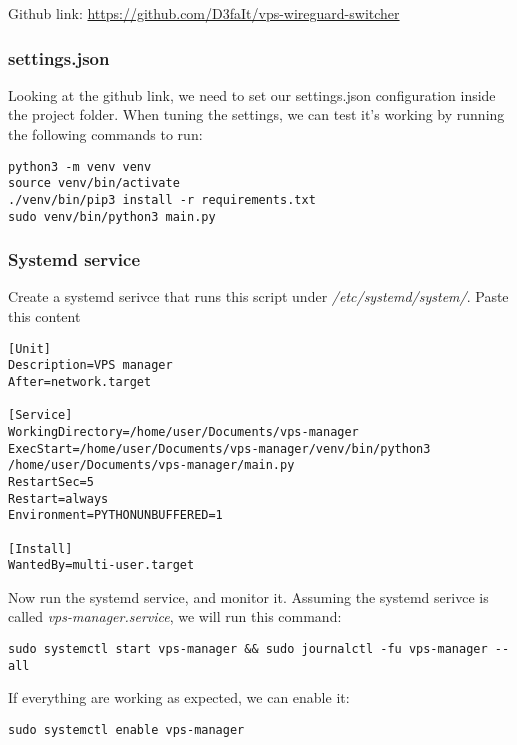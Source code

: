 \documentclass[letterpaper, 11pt]{article}
\begin{document}
Github link: \url{https://github.com/D3faIt/vps-wireguard-switcher}

\subsubsection{settings.json}
\label{sec:orgb27e8f2}
Looking at the github link, we need to set our settings.json configuration inside the project folder.
When tuning the settings, we can test it's working by running the following commands to run:

\begin{verbatim}
python3 -m venv venv
source venv/bin/activate
./venv/bin/pip3 install -r requirements.txt
sudo venv/bin/python3 main.py
\end{verbatim}

\subsubsection{Systemd service}
\label{sec:org1f88bd2}

Create a systemd serivce that runs this script under \textit{/etc/systemd/system/}.
Paste this content
\begin{verbatim}
[Unit]
Description=VPS manager
After=network.target

[Service]
WorkingDirectory=/home/user/Documents/vps-manager
ExecStart=/home/user/Documents/vps-manager/venv/bin/python3 /home/user/Documents/vps-manager/main.py
RestartSec=5
Restart=always
Environment=PYTHONUNBUFFERED=1

[Install]
WantedBy=multi-user.target
\end{verbatim}

Now run the systemd service, and monitor it. Assuming the systemd serivce is called \textit{vps-manager.service}, we will run this command:

\begin{verbatim}
sudo systemctl start vps-manager && sudo journalctl -fu vps-manager --all
\end{verbatim}

If everything are working as expected, we can enable it:
\begin{verbatim}
sudo systemctl enable vps-manager
\end{verbatim}
\end{document}
